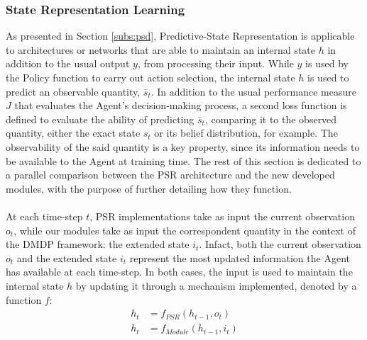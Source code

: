             \subsubsection{State Representation Learning}
                As presented in Section \ref{subs:psd}, Predictive-State Representation is applicable to architectures or networks that are able to maintain an internal state $h$ in addition to the usual output $y$, from processing their input. While $y$ is used by the Policy function to carry out action selection, the internal state $h$ is used to predict an observable quantity, $\bar{s}_t$. In addition to the usual performance measure $J$ that evaluates the Agent's decision-making process, a second loss function is defined to evaluate the ability of predicting $\bar{s}_t$, comparing it to the observed quantity, either the exact state $s_t$ or its belief distribution, for example. The observability of the said quantity is a key property, since its information needs to be available to the Agent at training time. The rest of this section is dedicated to a parallel comparison between the PSR architecture and the new developed modules, with the purpose of further detailing how they function.
                \\\\
                At each time-step $t$, PSR implementations take as input the current observation $o_t$, while our modules take as input the correspondent quantity in the context of the DMDP framework: the extended state $i_t$. Infact, both the current observation $o_t$ and the extended state $i_t$ represent the most updated information the Agent has available at each time-step. \newline
                In both cases, the input is used to maintain the internal state $h$ by updating it through a mechanism implemented, denoted by a function $f$:
                \begin{align*}
                    h_t &= f_{PSR}(h_{t-1}, o_t)\\
                    h_t &= f_{Module}(h_{t-1}, i_t)
                \end{align*}
